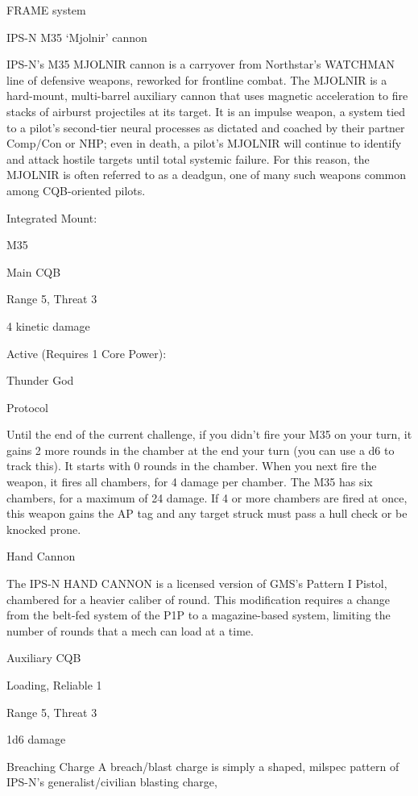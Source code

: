                                                  FRAME system

                                           IPS-N M35 ‘Mjolnir’ cannon

  IPS-N’s M35 MJOLNIR cannon is a carryover from Northstar’s WATCHMAN line of defensive weapons,
  reworked for frontline combat. The MJOLNIR is a hard-mount, multi-barrel auxiliary cannon that uses
  magnetic acceleration to fire stacks of airburst projectiles at its target. It is an impulse weapon, a system
  tied to a pilot’s second-tier neural processes as dictated and coached by their partner Comp/Con or
  NHP; even in death, a pilot’s MJOLNIR will continue to identify and attack hostile targets until total
  systemic failure. For this reason, the MJOLNIR is often referred to as a deadgun, one of many such
  weapons common among CQB-oriented pilots.

  Integrated Mount:

  M35

  Main CQB

  Range 5, Threat 3

  4 kinetic damage


  Active (Requires 1 Core Power):

  Thunder God

  Protocol

  Until the end of the current challenge, if you didn’t fire your M35 on your turn, it gains 2 more rounds in
  the chamber at the end your turn (you can use a d6 to track this). It starts with 0 rounds in the chamber.
  When you next fire the weapon, it fires all chambers, for 4 damage per chamber. The M35 has six
  chambers, for a maximum of 24 damage. If 4 or more chambers are fired at once, this weapon gains
  the AP tag and any target struck must pass a hull check or be knocked prone.

Hand Cannon




The IPS-N HAND CANNON is a licensed version of GMS’s Pattern I Pistol, chambered for a heavier caliber
of round. This modification requires a change from the belt-fed system of the P1P to a magazine-based
system, limiting the number of rounds that a mech can load at a time.

Auxiliary CQB

Loading, Reliable 1

Range 5, Threat 3

1d6 damage


Breaching Charge
A breach/blast charge is simply a shaped, milspec pattern of IPS-N’s generalist/civilian blasting charge,

